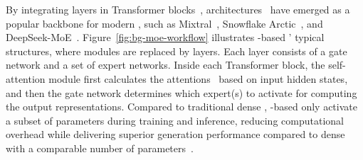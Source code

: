 By integrating \MoE layers in Transformer blocks~\cite{vaswani2017attention}, \MoE architectures~\cite{yuksel2012twenty} have emerged as a popular backbone for modern \LLMs, such as Mixtral~\cite{jiang2024mixtral}, Snowflake Arctic~\cite{snowflake-arctic}, and DeepSeek-MoE~\cite{dai2024deepseekmoe}. 
%
%
% 
Figure~\ref{fig:bg-moe-workflow} illustrates \MoE-based \LLMs' typical structures, where \FFN modules are replaced by \MoE layers. 
% 
Each \MoE layer consists of a gate network and a set of expert networks. Inside each Transformer block, the self-attention module first calculates the attentions~\cite{vaswani2017attention} based on input hidden states, and then the gate network determines which expert(s) to activate for computing the output representations. 
%
Compared to traditional dense \LLMs, \MoE-based \LLMs only activate a subset of parameters during training and inference, reducing computational overhead while delivering superior generation performance compared to dense \LLMs with a comparable number of parameters~\cite{jiang2024mixtral,snowflake-arctic,dai2024deepseekmoe,xai-grok,yang2024qwen2,abdin2024phi}.


